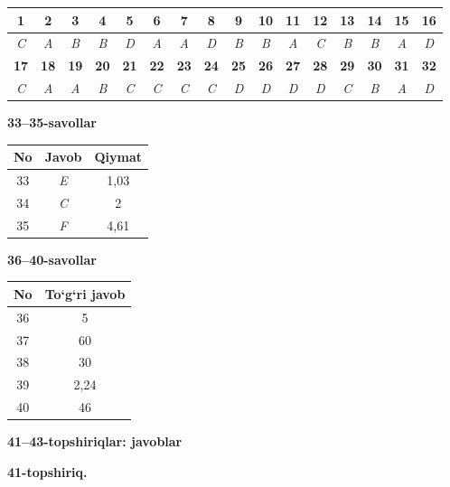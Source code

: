 \documentclass[11pt,a4paper]{article}
\begin{document}
\noindent\begin{tabular}{|c|c|c|c|c|c|c|c|c|c|c|c|c|c|c|c|}\hline
\textbf{1} & \textbf{2} & \textbf{3} & \textbf{4} & \textbf{5} & \textbf{6} & \textbf{7} & \textbf{8} & \textbf{9} & \textbf{10} & \textbf{11} & \textbf{12} & \textbf{13} & \textbf{14} & \textbf{15} & \textbf{16}\\\hline
\textsl{C} & \textsl{A} & \textsl{B} & \textsl{B} & \textsl{D} & \textsl{A} & \textsl{A} & \textsl{D} & \textsl{B} & \textsl{B} & \textsl{A} & \textsl{C} & \textsl{B} & \textsl{B} & \textsl{A} & \textsl{D}\\\hline
\textbf{17} & \textbf{18} & \textbf{19} & \textbf{20} & \textbf{21} & \textbf{22} & \textbf{23} & \textbf{24} & \textbf{25} & \textbf{26} & \textbf{27} & \textbf{28} & \textbf{29} & \textbf{30} & \textbf{31} & \textbf{32}\\\hline
\textsl{C} & \textsl{A} & \textsl{A} & \textsl{B} & \textsl{C} & \textsl{C} & \textsl{C} & \textsl{C} & \textsl{D} & \textsl{D} & \textsl{D} & \textsl{D} & \textsl{C} & \textsl{B} & \textsl{A} & \textsl{D}\\\hline
\end{tabular}\par\medskip
\noindent\textbf{33--35-savollar}\par\smallskip
\noindent\begin{tabular}{|c|c|c|}\hline \textbf{No} & \textbf{Javob} & \textbf{Qiymat}\\\hline
33 & \textsl{E} & 1,03\\\hline
34 & \textsl{C} & 2\\\hline
35 & \textsl{F} & 4,61\\\hline
\end{tabular}\par\medskip
\noindent\textbf{36--40-savollar}\par\smallskip
\noindent\begin{tabular}{|c|c|}\hline \textbf{No} & \textbf{To`g`ri javob}\\\hline
36 & 5\\\hline
37 & 60\\\hline
38 & 30\\\hline
39 & 2,24\\\hline
40 & 46\\\hline
\end{tabular}\par\medskip
\noindent\textbf{41--43-topshiriqlar: javoblar}\par\smallskip
\noindent\textbf{41-topshiriq.}\par
\end{document}
